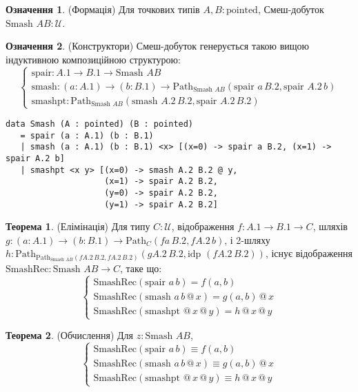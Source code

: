 \documentclass{article}
\theoremstyle{definition}
\newtheorem{theorem}{Теорема}
\newtheorem{definition}{Означення}
\begin{document}
\begin{definition} (Формація)
Для точкових типів \( A, B : \text{pointed} \), Смеш-добуток \( \text{Smash } A B : \mathcal{U} \).
\end{definition}

\begin{definition} (Конструктори)
Смеш-добуток генерується такою вищою індуктивною композиційною структурою:
\[
\begin{cases}
\text{spair} : A.1 \to B.1 \to \text{Smash } A B \\
\text{smash} : (a : A.1) \to (b : B.1) \to \text{Path}_{\text{Smash } A B} (\text{spair } a \, B.2, \text{spair } A.2 \, b) \\
\text{smashpt} : \text{Path}_{\text{Smash } A B} (\text{smash } A.2 \, B.2, \text{spair } A.2 \, B.2)
\end{cases}
\]
\begin{lstlisting}
data Smash (A : pointed) (B : pointed)
   = spair (a : A.1) (b : B.1)
   | smash (a : A.1) (b : B.1) <x> [(x=0) -> spair a B.2, (x=1) -> spair A.2 b]
   | smashpt <x y> [(x=0) -> smash A.2 B.2 @ y,
                    (x=1) -> spair A.2 B.2,
                    (y=0) -> spair A.2 B.2,
                    (y=1) -> spair A.2 B.2]
\end{lstlisting}
\end{definition}

\begin{theorem} (Елімінація)
Для типу \( C : \mathcal{U} \), відображення \( f : A.1 \to B.1 \to C \),
шляхів \( g : (a : A.1) \to (b : B.1) \to \text{Path}_C (f a \, B.2, f A.2 \, b) \),
і 2-шляху \( h : \text{Path}_{\text{Path}_{\text{Smash } A B} (f A.2 \, B.2, f A.2 \, B.2)} (g A.2 \, B.2, \text{idp } (f A.2 \, B.2)) \),
існує відображення \( \text{SmashRec} : \text{Smash } A B \to C \), таке що:
\[
\begin{cases}
\text{SmashRec}(\text{spair } a \, b) = f(a, b) \\
\text{SmashRec}(\text{smash } a \, b \, @ \, x) = g(a, b) \, @ \, x \\
\text{SmashRec}(\text{smashpt } @ \, x \, @ \, y) = h \, @ \, x \, @ \, y
\end{cases}
\]
\end{theorem}

\begin{theorem} (Обчислення)
Для \( z : \text{Smash } A B \),
\[
\begin{cases}
\text{SmashRec}(\text{spair } a \, b) \equiv f(a, b) \\
\text{SmashRec}(\text{smash } a \, b \, @ \, x) \equiv g(a, b) \, @ \, x \\
\text{SmashRec}(\text{smashpt } @ \, x \, @ \, y) \equiv h \, @ \, x \, @ \, y
\end{cases}
\]
\end{theorem}
\end{document}
